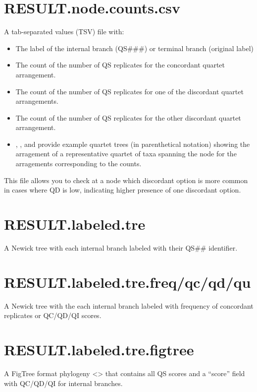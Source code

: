 \documentclass[letterpaper,12pt,english]{sphinxmanual}
\begin{document}
\section{RESULT.node.counts.csv}
\label{\detokenize{output:result-node-counts-csv}}
A tab-separated values (TSV) file with:
\begin{itemize}
\item {} 
 The label of the internal branch (QS\#\#\#) or terminal branch (original label)

\item {} 
 The count of the number of QS replicates for the concordant quartet arrangement.

\item {} 
 The count of the number of QS replicates for one of the discordant quartet arrangements.

\item {} 
 The count of the number of QS replicates for the other discordant quartet arrangement.

\item {} 
, , and  provide example quartet trees (in parenthetical notation) showing the arragement of a representative quartet of taxa spanning the node for the arragements corresponding to the counts.

\end{itemize}

This file allows you to check at a node which discordant option is more common in cases where QD is low, indicating higher presence of one discordant option.


\section{RESULT.labeled.tre}
\label{\detokenize{output:result-labeled-tre}}
A Newick tree with each internal branch labeled with their QS\#\# identifier.


\section{RESULT.labeled.tre.freq/qc/qd/qu}
\label{\detokenize{output:result-labeled-tre-freq-qc-qd-qu}}
A Newick tree with the each internal branch labeled with frequency of concordant replicates or QC/QD/QI scores.


\section{RESULT.labeled.tre.figtree}
\label{\detokenize{output:result-labeled-tre-figtree}}
A FigTree format phylogeny \textless{}\textgreater{} that contains all QS scores and a “score” field with QC/QD/QI for internal branches.
\end{document}
